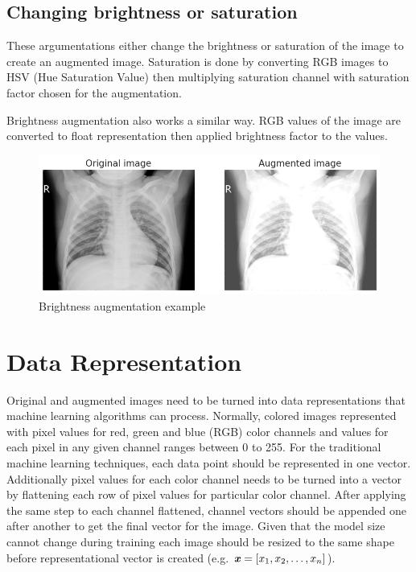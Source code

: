 \subsection{Changing brightness or saturation} \label{subsec:brightness}
These argumentations either change the brightness or saturation of the image to create an augmented image.
Saturation is done by converting RGB images to HSV (Hue Saturation Value) then multiplying saturation channel with saturation factor chosen for the augmentation.

Brightness augmentation also works a similar way.
RGB values of the image are converted to float representation then applied brightness factor to the values.

\begin{figure}[H]
    \centering
    \includegraphics[width=\textwidth]{img/augmented-image-1596666691.png}
    \caption{Brightness augmentation example}
    \label{fig:brightedxray}
\end{figure}


\section{Data Representation} \label{sec:datarepresentation}
Original and augmented images need to be turned into data representations that machine learning algorithms can process.
Normally, colored images represented with pixel values for red, green and blue (RGB) color channels and values for each pixel in any given channel ranges between 0 to 255.
For the traditional machine learning techniques, each data point should be represented in one vector.
Additionally pixel values for each color channel needs to be turned into a vector by flattening each row of pixel values for particular color channel.
After applying the same step to each channel flattened, channel vectors should be appended one after another to get the final vector for the image.
Given that the model size cannot change during training each image should be resized to the same shape before representational vector is created (e.g. $\textbf{\textit{x}} = [x_1, x_2, \ldots, x_n]$).

